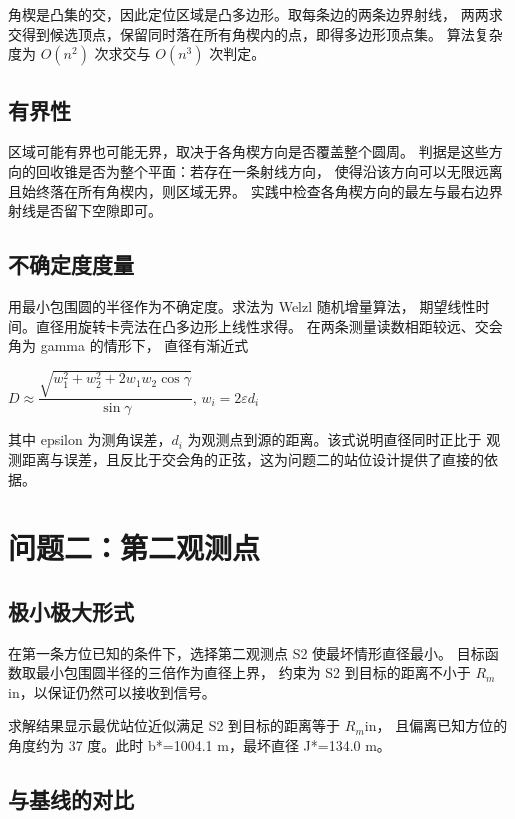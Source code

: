 角楔是凸集的交，因此定位区域是凸多边形。取每条边的两条边界射线，
两两求交得到候选顶点，保留同时落在所有角楔内的点，即得多边形顶点集。
算法复杂度为 $O(n^2)$ 次求交与 $O(n^3)$ 次判定。

\subsection{有界性}

区域可能有界也可能无界，取决于各角楔方向是否覆盖整个圆周。
判据是这些方向的回收锥是否为整个平面：若存在一条射线方向，
使得沿该方向可以无限远离且始终落在所有角楔内，则区域无界。
实践中检查各角楔方向的最左与最右边界射线是否留下空隙即可。

\subsection{不确定度度量}

用最小包围圆的半径作为不确定度。求法为 Welzl 随机增量算法，
期望线性时间。直径用旋转卡壳法在凸多边形上线性求得。
在两条测量读数相距较远、交会角为 gamma 的情形下，
直径有渐近式

\begin{center}
$D \approx \dfrac{\sqrt{w_1^2 + w_2^2 + 2 w_1 w_2 \cos\gamma}}{\sin\gamma}$,
\qquad $w_i = 2\varepsilon d_i$
\end{center}

其中 epsilon 为测角误差，$d_i$ 为观测点到源的距离。该式说明直径同时正比于
观测距离与误差，且反比于交会角的正弦，这为问题二的站位设计提供了直接的依据。

\section{问题二：第二观测点}

\subsection{极小极大形式}

在第一条方位已知的条件下，选择第二观测点 S2 使最坏情形直径最小。
目标函数取最小包围圆半径的三倍作为直径上界，
约束为 S2 到目标的距离不小于 $R_m$in，以保证仍然可以接收到信号。

求解结果显示最优站位近似满足 S2 到目标的距离等于 $R_m$in，
且偏离已知方位的角度约为 37 度。此时 b*=1004.1 m，最坏直径 J*=134.0 m。

\subsection{与基线的对比}


